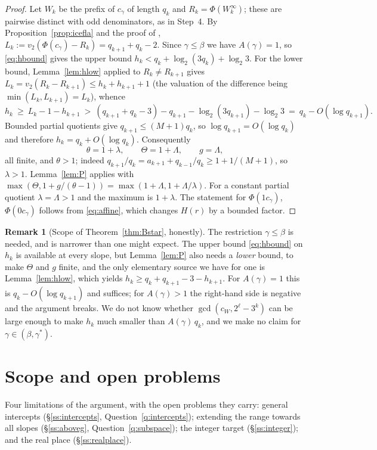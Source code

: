 \documentclass[11pt,reqno]{amsart}
\theoremstyle{plain}
\theoremstyle{definition}
\newtheorem{remark}[theorem]{Remark}
\newcommand{\PH}{\Phi}
\newcommand{\gs}{\gamma^{*}}
\newcommand{\Av}{A(\gamma)}
\newcommand{\vtwo}{v_2}
\begin{document}
\begin{proof}
Let $W_k$ be the prefix of $c_\gamma$ of length $q_k$ and $R_k=\PH(W_k^{\infty})$; these are
pairwise distinct with odd denominators, as in Step~4. By Proposition~\ref{prop:icefla} and the
proof of \cite[\S4.2]{BHZ06}, $L_k:=\vtwo(\PH(c_\gamma)-R_k)=q_{k+1}+q_k-2$. Since
$\gamma\le\beta$ we have $\Av=1$, so \eqref{eq:hbound} gives the upper bound
$h_k<q_k+\log_2(3q_k)+\log_2 3$. For the lower bound, Lemma~\ref{lem:hlow} applied to $R_k\ne
R_{k+1}$ gives $L_k=\vtwo(R_k-R_{k+1})\le h_k+h_{k+1}+1$ (the valuation of the difference being
$\min(L_k,L_{k+1})=L_k$), whence
\[
  h_k\ \ge\ L_k-1-h_{k+1}\ >\ (q_{k+1}+q_k-3)-q_{k+1}-\log_2(3q_{k+1})-\log_2 3
  \ =\ q_k-O(\log q_{k+1}).
\]
Bounded partial quotients give $q_{k+1}\le(M+1)q_k$, so $\log q_{k+1}=O(\log q_k)$ and therefore
$h_k=q_k+O(\log q_k)$. Consequently
\[
  \theta=1+\lambda,\qquad \Theta=1+\Lambda,\qquad g=\Lambda,
\]
all finite, and $\theta>1$; indeed $q_{k+1}/q_k=a_{k+1}+q_{k-1}/q_k\ge1+1/(M+1)$, so
$\lambda>1$. Lemma~\ref{lem:P} applies with
$\max(\Theta,1+g/(\theta-1))=\max(1+\Lambda,1+\Lambda/\lambda)$. For a constant partial quotient
$\lambda=\Lambda>1$ and the maximum is $1+\lambda$. The statement for $\PH(1c_\gamma)$,
$\PH(0c_\gamma)$ follows from \eqref{eq:affine}, which changes $H(r)$ by a bounded factor.
\end{proof}

\begin{remark}[Scope of Theorem~\ref{thm:Bstar}, honestly]\label{rem:Bscope}
The restriction $\gamma\le\beta$ is needed, and is narrower than one might expect. The upper bound
\eqref{eq:hbound} on $h_k$ is available at every slope, but Lemma~\ref{lem:P} also needs a
\emph{lower} bound, to make $\Theta$ and $g$ finite, and the only elementary source we have for one
is Lemma~\ref{lem:hlow}, which yields $h_k\ge q_k+q_{k+1}-3-h_{k+1}$. For $\Av=1$ this is
$q_k-O(\log q_{k+1})$ and suffices; for $\Av>1$ the right-hand side is negative and the argument
breaks. We do not know whether $\gcd(c_W,2^{\ell}-3^{k})$ can be large enough to make $h_k$ much
smaller than $\Av\,q_k$, and we make no claim for $\gamma\in(\beta,\gs)$.
\end{remark}

\section{Scope and open problems}\label{sec:scope}

Four limitations of the argument, with the open problems they carry: general intercepts
(\S\ref{ss:intercepts}, Question~\ref{q:intercepts}); extending the range towards all slopes
(\S\ref{ss:aboveg}, Question~\ref{q:subspace}); the integer target (\S\ref{ss:integer}); and the
real place (\S\ref{ss:realplace}).
\end{document}
